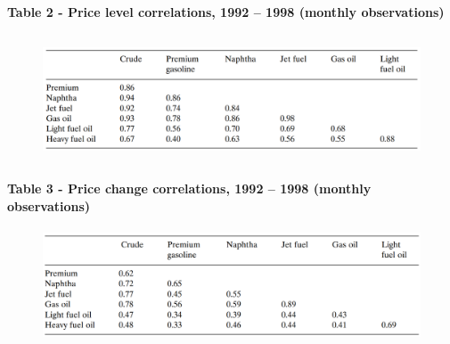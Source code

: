\documentclass[12pt,twoside]{article}
\begin{document}
\begin{Center}
{\fontsize{11pt}{13.2pt}\selectfont \textbf{Table 2 - Price level correlations, 1992 – 1998 (monthly observations)}\par}
\end{Center}\par




\begin{figure}[H]
	\begin{Center}
		\includegraphics[width=5.05in,height=1.52in]{./media/image4.png}
	\end{Center}
\end{figure}



\begin{justify}
{\fontsize{11pt}{13.2pt}\selectfont \par}
\end{justify}\par

\begin{Center}
{\fontsize{11pt}{13.2pt}\selectfont \textbf{Table 3 - Price change correlations, 1992 – 1998 (monthly observations)}\par}
\end{Center}\par




\begin{figure}[H]
	\begin{Center}
		\includegraphics[width=5.03in,height=1.33in]{./media/image5.png}
	\end{Center}
\end{figure}
\end{document}
